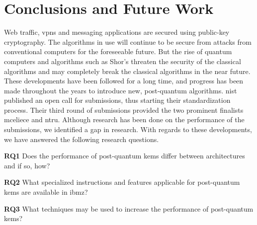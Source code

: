 \chapter{Conclusions and Future Work}
\label{chapter:conclusion}


\noindent Web traffic, \glspl{vpn} and messaging applications are secured using public-key cryptography. The algorithms in use will continue to be secure from attacks from conventional computers for the foreseeable future.  But the rise of quantum computers and algorithms such as Shor's threaten the security of the classical algorithms and may completely break the classical algorithms in the near future. These developments have been followed for a long time, and progress has been made throughout the years to introduce new, \gls{post-quantum} algorithms. \acrfull{nist} published an open call for submissions, thus starting their standardization process. Their third round of submissions provided the two prominent finalists \gls{mceliece} and \gls{ntru}. Although research has been done on the performance of the submissions, we identified a gap in research. With regards to these developments, we have answered the following research questions.

\begin{description}
    \item \textbf{RQ1} Does the performance of \gls{post-quantum} \glspl{kem} differ between architectures and if so, how?
    
    \item \textbf{RQ2} What specialized instructions and features applicable for \gls{post-quantum} \glspl{kem} are available in \gls{ibmz}?
    
    \item \textbf{RQ3} What techniques may be used to increase the performance of \gls{post-quantum} \glspl{kem}?
\end{description}

